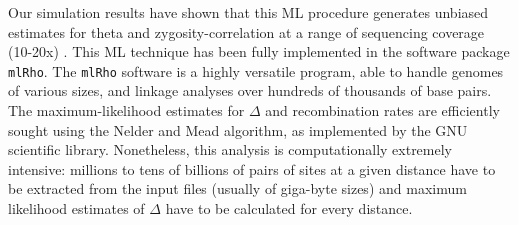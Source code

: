 \documentclass{sig-alternate}
\begin{document}









Our simulation results have shown that this ML procedure generates unbiased estimates for theta and
zygosity-correlation at a range of sequencing coverage (10-20x) \cite{Lynch01112008}.  This ML technique has
been fully implemented in the software package \texttt{mlRho}. The \texttt{mlRho} software is a highly
versatile program, able to handle genomes of various sizes, and linkage analyses over hundreds of thousands of
base pairs. The maximum-likelihood estimates for $\Delta$ and recombination rates are efficiently sought using
the Nelder and Mead algorithm, as implemented by the GNU scientific library. Nonetheless, this analysis is
computationally extremely intensive: millions to tens of billions of pairs of sites at a given distance have
to be extracted from the input files (usually of giga-byte sizes) and maximum likelihood estimates of $\Delta$
have to be calculated for every distance.
\end{document}
